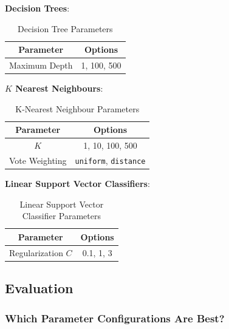 \documentclass[11pt]{article}
\begin{document}
\textbf{Decision Trees}:
\begin{table}[h]
	\begin{center}
		\begin{tabular}{|c|c|}			
			\hline
			Parameter & Options \\
			\hline
			Maximum Depth & 1, 100, 500 \\
			\hline
		\end{tabular}
		\caption{Decision Tree Parameters}
		\label{tbl:dt-options}
	\end{center}
\end{table}

\textbf{$K$ Nearest Neighbours}:
\begin{table}[H]
	\begin{center}
		\begin{tabular}{|c|c|}			
			\hline
			Parameter & Options \\
			\hline
			$K$ & 1, 10, 100, 500 \\
			Vote Weighting & \texttt{uniform}, \texttt{distance} \\
			\hline
		\end{tabular}
		\caption{K-Nearest Neighbour Parameters}
		\label{tbl:knn-options}
	\end{center}
\end{table}

\pagebreak
\textbf{Linear Support Vector Classifiers}:
\begin{table}[H]
	\begin{center}
		\begin{tabular}{|c|c|}			
			\hline
			Parameter & Options \\
			\hline
			Regularization $C$ & 0.1, 1, 3 \\
			\hline
		\end{tabular}
		\caption{Linear Support Vector Classifier Parameters}
		\label{tbl:svc-options}
	\end{center}
\end{table}


\subsection{Evaluation}\label{sec:evaluations}

\subsubsection{Which Parameter Configurations Are Best?}\label{sec:choosing2}
\end{document}

